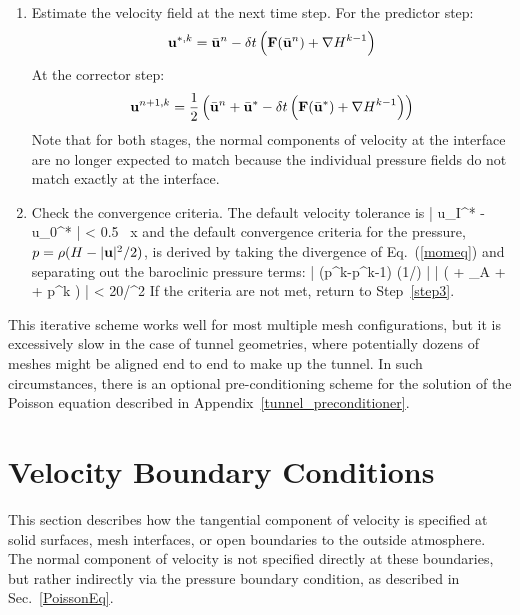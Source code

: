 \begin{enumerate}
\item Estimate the velocity field at the next time step. For the predictor step:
\begin{equation}
\label{eqn_RK1}
\mathbf{u}^{*,k} = \bar{\mathbf{u}}^n - \delta t \left( \mathbf{F}(\bar{\mathbf{u}}^n) + {\nabla H}^{k-1} \right)
\end{equation}
At the corrector step:
\begin{equation}
\label{eqn_RK2}
\mathbf{u}^{n+1,k} = \frac{1}{2} \left( \bar{\mathbf{u}}^n + \bar{\mathbf{u}}^* - \delta t \left( \mathbf{F}(\bar{\mathbf{u}}^*) + {\nabla H}^{k-1} \right) \right)
\end{equation}
Note that for both stages, the normal components of velocity at the interface are no longer expected to match because the individual pressure fields do not match exactly at the interface.

\item Check the convergence criteria. The default velocity tolerance is
   \be
      \left| u_I^* - u_0^* \right| < 0.5 \, \delta x
   \ee
    and the default convergence criteria for the pressure, $p=\rho(H-|{\mathbf{u}}|^2/2)$, is derived by taking the divergence of Eq.~(\ref{momeq}) and separating out the baroclinic pressure terms:
   \be
       \left| \nabla \cdot (p^k-p^{k-1}) \nabla (1/\rho) \right| \equiv \left| \nabla \cdot \left(  + \bF_{\rm A} +  \nabla {} +  \nabla p^k \right)  \right| < 20/\dx^2
   \ee
   If the criteria are not met, return to Step~\ref{step3}.
\end{enumerate}
This iterative scheme works well for most multiple mesh configurations, but it is excessively slow in the case of tunnel geometries, where potentially dozens of meshes might be aligned end to end to make up the tunnel. In such circumstances, there is an optional pre-conditioning scheme for the solution of the Poisson equation described in Appendix~\ref{tunnel_preconditioner}.




\newpage
\section{Velocity Boundary Conditions}
\label{info:velocity_bc}

This section describes how the tangential component of velocity is specified at solid surfaces, mesh interfaces, or open boundaries to the outside atmosphere. The normal component of velocity is not specified directly at these boundaries, but rather indirectly via the pressure boundary condition, as described in Sec.~\ref{PoissonEq}.

